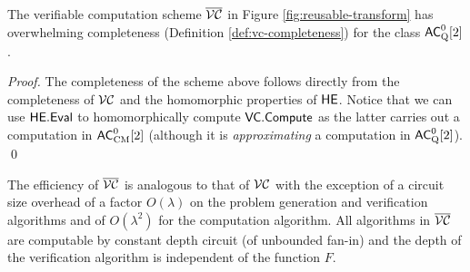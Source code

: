 \begin{corollary}
The verifiable computation scheme $\overline{{\cal VC}}$ in Figure \ref{fig:reusable-transform} has overwhelming completeness (Definition \ref{def:vc-completeness}) for the class ${\mathsf{AC}}^0_{\text{Q}}[2]$.
\end{corollary}
\begin{proof}
The completeness of the scheme above follows directly from the completeness of ${\cal VC}$ and the homomorphic properties of $\mathsf{HE}$.
Notice that we can use $\mathsf{HE.Eval}$ to homomorphically compute $\mathsf{VC.Compute}$ as the latter carries out a computation in ${\mathsf{AC}}^0_{\text{CM}}[2]$ (although it is \textit{approximating} a computation in ${\mathsf{AC}}^0_{\text{Q}}[2]$). \qed
\end{proof}

\begin{remark}
The efficiency of $\overline{{\cal VC}}$ is analogous to that of ${\cal VC}$ with the exception of a circuit size overhead of a factor $O(\lambda)$ on the problem generation and verification algorithms and of $O(\lambda^2)$ for the computation algorithm.
All algorithms in $\overline{{\cal VC}}$ are computable by constant depth circuit (of unbounded fan-in) and the depth of the verification algorithm is independent of the function $F$.
\end{remark}


